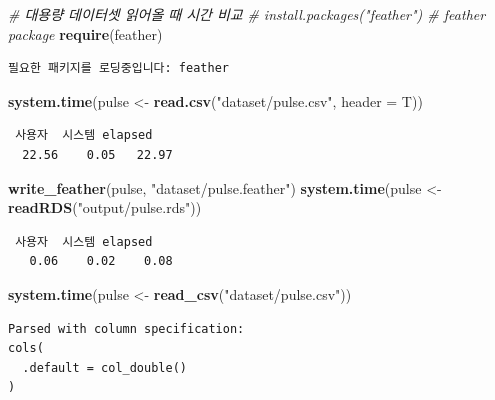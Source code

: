 \documentclass[
  11pt,
]{krantz}
\newenvironment{Shaded}{\begin{snugshade}}{\end{snugshade}}
\newcommand{\CommentTok}[1]{\textcolor[rgb]{0.37,0.37,0.37}{\textit{#1}}}
\newcommand{\DataTypeTok}[1]{\textcolor[rgb]{0.27,0.27,0.27}{#1}}
\newcommand{\KeywordTok}[1]{\textcolor[rgb]{0.27,0.27,0.27}{\textbf{#1}}}
\newcommand{\NormalTok}[1]{#1}
\newcommand{\StringTok}[1]{\textcolor[rgb]{0.5,0.5,0.5}{#1}}
\begin{document}
\begin{Shaded}
\begin{Highlighting}[]
\CommentTok{# 대용량 데이터셋 읽어올 때 시간 비교}
\CommentTok{# install.packages("feather") # feather package}
\KeywordTok{require}\NormalTok{(feather)}
\end{Highlighting}
\end{Shaded}

\begin{verbatim}
필요한 패키지를 로딩중입니다: feather
\end{verbatim}

\begin{Shaded}
\begin{Highlighting}[]
\KeywordTok{system.time}\NormalTok{(pulse <-}\StringTok{ }\KeywordTok{read.csv}\NormalTok{(}\StringTok{"dataset/pulse.csv"}\NormalTok{, }\DataTypeTok{header =}\NormalTok{ T))}
\end{Highlighting}
\end{Shaded}

\begin{verbatim}
 사용자  시스템 elapsed 
  22.56    0.05   22.97 
\end{verbatim}

\begin{Shaded}
\begin{Highlighting}[]
\KeywordTok{write_feather}\NormalTok{(pulse, }\StringTok{"dataset/pulse.feather"}\NormalTok{)}
\KeywordTok{system.time}\NormalTok{(pulse <-}\StringTok{ }\KeywordTok{readRDS}\NormalTok{(}\StringTok{"output/pulse.rds"}\NormalTok{))}
\end{Highlighting}
\end{Shaded}

\begin{verbatim}
 사용자  시스템 elapsed 
   0.06    0.02    0.08 
\end{verbatim}

\begin{Shaded}
\begin{Highlighting}[]
\KeywordTok{system.time}\NormalTok{(pulse <-}\StringTok{ }\KeywordTok{read_csv}\NormalTok{(}\StringTok{"dataset/pulse.csv"}\NormalTok{))}
\end{Highlighting}
\end{Shaded}

\begin{verbatim}
Parsed with column specification:
cols(
  .default = col_double()
)
\end{verbatim}
\end{document}
